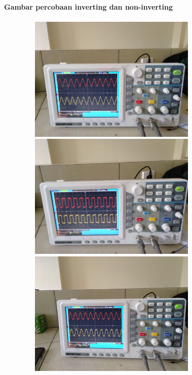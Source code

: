 \documentclass[12pt,a4paper]{article}
\begin{document}
\newpage
\begin{figure}
\paragraph{Gambar percobaan inverting dan non-inverting}
\paragraph{ }
\begin{center}

\includegraphics[width=12cm, height=6cm]{Different2.png}

\includegraphics[width=12cm, height=6cm]{Diferent3.png}

\includegraphics[width=12cm, height=6cm]{Diferent4.png}

\end{center}
\end{figure}
\vspace{2cm}
\end{document}
